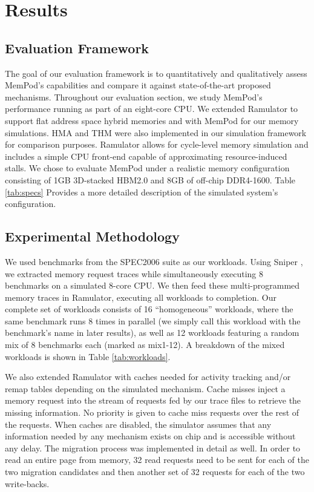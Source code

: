 \section{Results}
\label{sec:Results}

\subsection{Evaluation Framework}
\label{sub:Evaluation}

The goal of our evaluation framework is to quantitatively and qualitatively assess MemPod's capabilities and compare it against state-of-the-art proposed mechanisms. Throughout our evaluation section, we study MemPod's performance running as part of an eight-core CPU. We extended Ramulator \cite{kim-ramulator} to support flat address space hybrid memories and with MemPod for our memory simulations. HMA and THM were also implemented in our simulation framework for comparison purposes. Ramulator allows for cycle-level memory simulation and includes a simple CPU front-end capable of approximating resource-induced stalls. We chose to evaluate MemPod under a realistic memory configuration consisting of 1GB 3D-stacked HBM2.0 \TODO{[Cite]} and 8GB of off-chip DDR4-1600. Table \ref{tab:specs} Provides a more detailed description of the simulated system's configuration.

\subsection{Experimental Methodology}
\label{sub:Experimental}

We used benchmarks from the SPEC2006 suite \cite{spec} as our workloads. Using Sniper \cite{sniper}, we extracted memory request traces while simultaneously executing 8 benchmarks on a simulated 8-core CPU. We then feed these multi-programmed memory traces in Ramulator, executing all workloads to completion. Our complete set of workloads consists of 16 ``homogeneous'' workloads, where the same benchmark runs 8 times in parallel (we simply call this workload with the benchmark's name in later results), as well as 12 workloads featuring a random mix of 8 benchmarks each (marked as mix1-12). A breakdown of the mixed workloads is shown in Table \ref{tab:workloads}.

We also extended Ramulator with caches needed for activity tracking and/or remap tables depending on the simulated mechanism. Cache misses inject a memory request into the stream of requests fed by our trace files to retrieve the missing information. No priority is given to cache miss requests over the rest of the requests. When caches are disabled, the simulator assumes that any information needed by any mechanism exists on chip and is accessible without any delay. The migration process was implemented in detail as well. In order to read an entire page from memory, 32 read requests need to be sent for each of the two migration candidates and then another set of 32 requests for each of the two write-backs.

